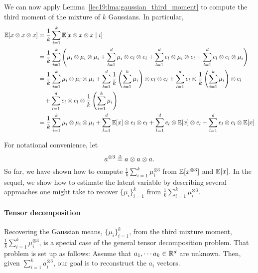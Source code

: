 We can now apply Lemma~\ref{lec19:lma:gaussian_third_moment} to compute the third moment of the mixture of $k$ Gaussians. In particular,
\begin{align}
	\operatorname*{\mathbb{E}}[x \otimes x \otimes x] & =  \frac{1}{k} \sum_{i=1}^k \operatorname*{\mathbb{E}}[x \otimes x \otimes x \mid i] \\
	&=  \frac{1}{k} \sum_{i=1}^k \left (\mu_i \otimes \mu_i \otimes \mu_i +  \sum_{l=1}^d \mu_i \otimes e_l \otimes e_l + \sum_{l=1}^d  e_l \otimes \mu_i \otimes e_l + \sum_{l=1}^d  e_l \otimes e_l \otimes \mu_i \right ) \\
	&=  \frac{1}{k} \sum_{i=1}^k \mu_i \otimes \mu_i \otimes \mu_i +  \sum_{l=1}^d \frac{1}{k} \left (\sum_{i=1}^k \mu_i \right ) \otimes e_l \otimes e_l + \sum_{l=1}^d  e_l \otimes \frac{1}{k} \left (\sum_{i=1}^k \mu_i \right ) \otimes e_l \nonumber \\
    &\quad + \sum_{l=1}^d  e_l \otimes e_l \otimes \frac{1}{k} \left (\sum_{i=1}^k \mu_i \right) \\
	& =  \frac{1}{k} \sum_{i=1}^k \mu_i \otimes \mu_i \otimes \mu_i +  \sum_{l=1}^d \operatorname*{\mathbb{E}}[x] \otimes e_l \otimes e_l + \sum_{l=1}^d  e_l \otimes \operatorname*{\mathbb{E}}[x] \otimes e_l + \sum_{l=1}^d  e_l \otimes e_l \otimes \operatorname*{\mathbb{E}}[x]\\
\end{align} 

For notational convenience, let
\begin{equation}
    a^{\otimes 3} \defeq a \otimes a \otimes a.
\end{equation} 
So far, we have shown how to compute $\frac{1}{k} \sum_{i=1}^k \mu_i^{\otimes 3}$ from $\operatorname*{\mathbb{E}}[x^{\otimes 3}]$ and $\operatorname*{\mathbb{E}}[x]$. In the sequel, we show how to estimate the latent variable by describing several approaches one might take to recover $\{\mu_i\}_{i = 1}^k$ from $\frac{1}{k} \sum_{i = 1}^k \mu_i^{\otimes 3}$. 

\paragraph{Tensor decomposition}
Recovering the Gaussian means, $\{\mu_i\}_{i = 1}^k$,  from the third mixture moment, $\frac{1}{k} \sum_{i = 1}^k \mu_i^{\otimes 3}$, is a special case of the general tensor decomposition problem. That problem is set up as follows: Assume that $a_1, \cdots a_k \in \mathbb R^d$ are unknown. Then, given $\sum_{i=1}^k a_i^{\otimes 3}$, our goal is to reconstruct the $a_i$ vectors. 

